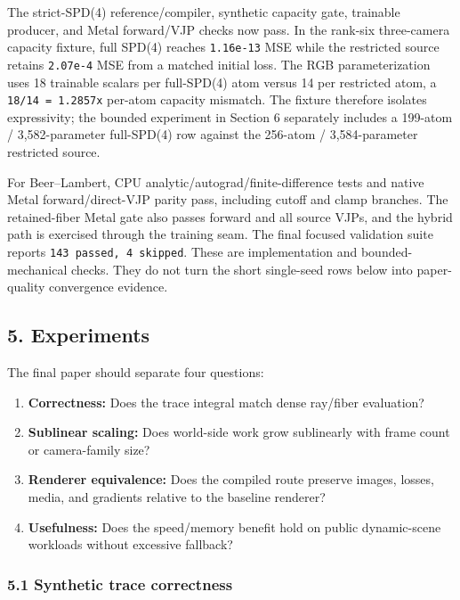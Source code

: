 \documentclass[
]{article}
\providecommand{\tightlist}{%
  \setlength{\itemsep}{0pt}\setlength{\parskip}{0pt}}
\begin{document}
The strict-SPD(4) reference/compiler, synthetic capacity gate, trainable
producer, and Metal forward/VJP checks now pass. In the rank-six
three-camera capacity fixture, full SPD(4) reaches \texttt{1.16e-13} MSE
while the restricted source retains \texttt{2.07e-4} MSE from a matched
initial loss. The RGB parameterization uses 18 trainable scalars per
full-SPD(4) atom versus 14 per restricted atom, a
\texttt{18/14\ =\ 1.2857x} per-atom capacity mismatch. The fixture
therefore isolates expressivity; the bounded experiment in Section 6
separately includes a 199-atom / 3,582-parameter full-SPD(4) row against
the 256-atom / 3,584-parameter restricted source.

For Beer--Lambert, CPU analytic/autograd/finite-difference tests and
native Metal forward/direct-VJP parity pass, including cutoff and clamp
branches. The retained-fiber Metal gate also passes forward and all
source VJPs, and the hybrid path is exercised through the training seam.
The final focused validation suite reports
\texttt{143\ passed,\ 4\ skipped}. These are implementation and
bounded-mechanical checks. They do not turn the short single-seed rows
below into paper-quality convergence evidence.

\subsection{5. Experiments}\label{experiments}

The final paper should separate four questions:

\begin{enumerate}
\def\labelenumi{\arabic{enumi}.}
\tightlist
\item
  \textbf{Correctness:} Does the trace integral match dense ray/fiber
  evaluation?
\item
  \textbf{Sublinear scaling:} Does world-side work grow sublinearly with
  frame count or camera-family size?
\item
  \textbf{Renderer equivalence:} Does the compiled route preserve
  images, losses, media, and gradients relative to the baseline
  renderer?
\item
  \textbf{Usefulness:} Does the speed/memory benefit hold on public
  dynamic-scene workloads without excessive fallback?
\end{enumerate}

\subsubsection{5.1 Synthetic trace
correctness}\label{synthetic-trace-correctness}
\end{document}
